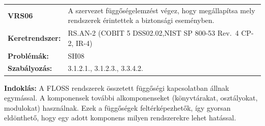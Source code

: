 \documentclass[12pt,magyar,a4paper,oneside]{scrreprt}
\begin{document}
\begin{longtable}[]{@{}ll@{}}
\toprule
\endhead
\begin{minipage}[t]{0.16\columnwidth}\raggedright
\textbf{VRS06}\strut
\end{minipage} & \begin{minipage}[t]{0.79\columnwidth}\raggedright
A szervezet függőségelemzést végez, hogy megállapítsa mely rendszerek
érintettek a biztonsági eseményben.\strut
\end{minipage}\tabularnewline
\begin{minipage}[t]{0.16\columnwidth}\raggedright
\textbf{Keretrendszer:}\strut
\end{minipage} & \begin{minipage}[t]{0.79\columnwidth}\raggedright
RS.AN-2 (COBIT 5 DSS02.02,NIST SP 800-53 Rev.~4 CP-2, IR-4)\strut
\end{minipage}\tabularnewline
\begin{minipage}[t]{0.16\columnwidth}\raggedright
\textbf{Problémák:}\strut
\end{minipage} & \begin{minipage}[t]{0.79\columnwidth}\raggedright
SH08\strut
\end{minipage}\tabularnewline
\begin{minipage}[t]{0.16\columnwidth}\raggedright
\textbf{Szabályozás:}\strut
\end{minipage} & \begin{minipage}[t]{0.79\columnwidth}\raggedright
3.1.2.1., 3.1.2.3., 3.3.4.2.\strut
\end{minipage}\tabularnewline
\bottomrule
\end{longtable}

\textbf{Indoklás: } A FLOSS rendszerek összetett függőségi kapcsolatban
állnak egymással. A komponensek további alkomponenseket (könyvtárakat,
osztályokat, modulokat) használnak. Ezek a függőségek feltérképezhetők,
így gyorsan eldönthető, hogy egy adott komponens milyen rendszerekre
lehet hatással.
\end{document}
